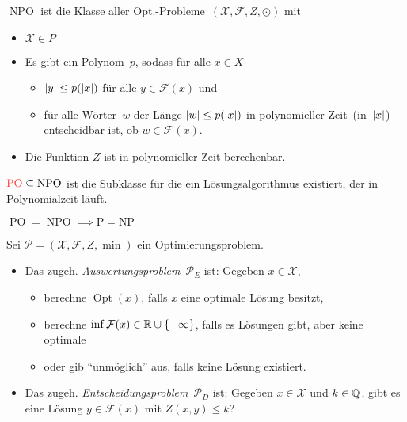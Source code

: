 \documentclass{cheat-sheet}
\newcommand{\Instances}{\mathcal{X}} %
\newcommand{\Feasible}{\mathcal{F}} %
\newcommand{\ObjFun}{Z} %
\newcommand{\Goal}{\odot} %
\newcommand{\OptTuple}{(\Instances{}, \Feasible{}, \ObjFun{}, \Goal)} %
\newcommand{\MinOptTuple}{(\Instances{}, \Feasible{}, \ObjFun{}, \min)} %
\DeclareMathOperator{\Opt}{Opt} %
\newcommand{\size}[1]{\abs{#1}} %
\DeclareMathOperator{\NPO}{NPO} %
\DeclareMathOperator{\PO}{PO} %
\newcommand{\Prob}{\mathcal{P}} %
\newcommand{\Defn}[1]{\textcolor{DefinitionColor}{#1}}
\begin{document}
\begin{defn}
  \Defn{$\NPO$} ist die Klasse aller Opt.-Probleme~$\OptTuple$ mit
  \begin{itemize}
    \item $\Instances{} \in P$
    \item Es gibt ein Polynom~$p$, sodass für alle $x \in X$
    \begin{itemize}
      \item $\size{y} \leq p(\size{x})$ für alle $y \in \Feasible(x)$ und
      \item für alle Wörter~$w$ der Länge $\size{w} \leq p(\size{x})$ in polynomieller Zeit~(in~$\size{x}$) entscheidbar ist, ob $w \in \Feasible(x)$.
    \end{itemize}
    \item Die Funktion $\ObjFun$ ist in polynomieller Zeit berechenbar.
  \end{itemize}
\end{defn}

\begin{defn}
  $\Defn{\PO} \subseteq \NPO$ ist die Subklasse für die ein Lösungsalgorithmus existiert, der in Polynomialzeit läuft.
\end{defn}

\begin{beob}
  $\PO = \NPO \implies \text{P} = \text{NP}$
\end{beob}


\begin{defn}
  Sei $\Prob = \MinOptTuple$ ein Optimierungsproblem.
  \begin{itemize}
    \item Das zugeh. \emph{Auswertungsproblem}~$\Prob_E$ ist: Gegeben $x \in \Instances$,
    \begin{itemize}
      \item berechne $\Opt(x)$, falls $x$ eine optimale Lösung besitzt,
      \item berechne $\inf \Feasible(x) \in \R \cup \{ -\infty \}$, falls es Lösungen gibt, aber keine optimale
      \item oder gib "`unmöglich"' aus, falls keine Lösung existiert.
    \end{itemize}
    \item Das zugeh. \emph{Entscheidungsproblem}~$\Prob_D$ ist: Gegeben $x \in \Instances$ und $k \in \mathbb{Q}$, gibt es eine Lösung $y \in \Feasible(x)$ mit $Z(x, y) \leq k$?
  \end{itemize}
\end{defn}
\end{document}
